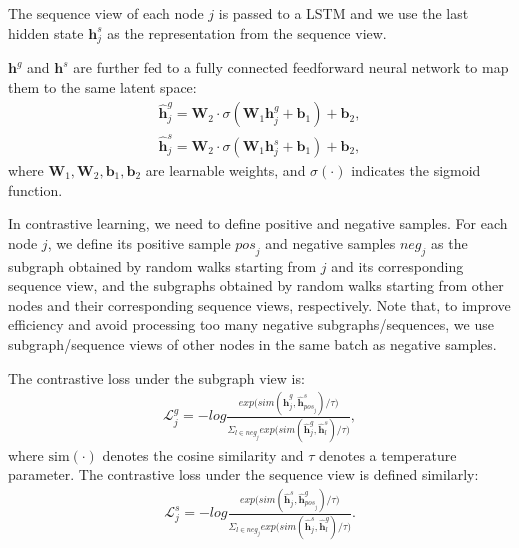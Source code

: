 The sequence view of each node $j$ is passed to a LSTM and we use the last hidden state $\mathbf{h}^{s}_j$ as the representation from the sequence view.

$\mathbf{h}^g$ and $\mathbf{h}^s$ are further fed to a fully connected feedforward neural network to map them to the same latent space:
\begin{equation}
	\label{eq:mapping}
	\begin{aligned}
		\hat{\mathbf{h}}_j^g = \textbf{W}_2 \cdot \sigma(\textbf{W}_1 \mathbf{h}_j^g + \textbf{b}_1) + \textbf{b}_2, \\
		\hat{\mathbf{h}}_j^{s} = \textbf{W}_2 \cdot \sigma(\textbf{W}_1 \mathbf{h}_j^{s} + \textbf{b}_1) + \textbf{b}_2,
	\end{aligned}
\end{equation}
where {$\textbf{W}_1, \textbf{W}_2, \textbf{b}_1, \textbf{b}_2$} are learnable weights, and $\sigma(\cdot)$ indicates the sigmoid function.

In contrastive learning, we need to define positive and negative samples.  
For each node $j$, we define its positive sample $\mathit{pos}_j$ and negative samples $\mathit{neg}_j$ as the subgraph obtained by random walks starting from $j$ and its corresponding sequence view, and the subgraphs obtained by random walks starting from other nodes and their corresponding sequence views, respectively.
Note that, to improve efficiency and avoid processing too many negative subgraphs/sequences, we use subgraph/sequence views of other nodes in the same batch as negative samples. 


The contrastive loss under the subgraph view is:
\begin{equation}
	\begin{aligned}
		\mathcal{L}_j^{g} = -log 
		\frac{exp\big(sim(\hat{\mathbf{h}}_j^g, \hat{\mathbf{h}}_{\mathit{pos}_j}^{s})/\tau\big)}
		{\Sigma_{l \in \mathit{neg}_j}exp\big(sim(\hat{\mathbf{h}}_j^g, \hat{\mathbf{h}}_l^{s})/\tau\big)},
	\end{aligned}
\end{equation}
where $\text{sim}(\cdot)$ denotes the cosine similarity and $\tau$ denotes a temperature parameter. 
The contrastive loss under the sequence view is defined similarly:
 \begin{equation}
	\begin{aligned}
		\mathcal{L}_j^{s} = -log 
		\frac{exp\big(sim(\hat{\mathbf{h}}_j^{s}, \hat{\mathbf{h}}_{\mathit{pos}_j}^{g})/\tau\big)}
		{\Sigma_{l \in \mathit{neg}_j}exp\big(sim(\hat{\mathbf{h}}_j^{s}, \hat{\mathbf{h}}_l^{g})/\tau\big)}.
	\end{aligned}
\end{equation}

